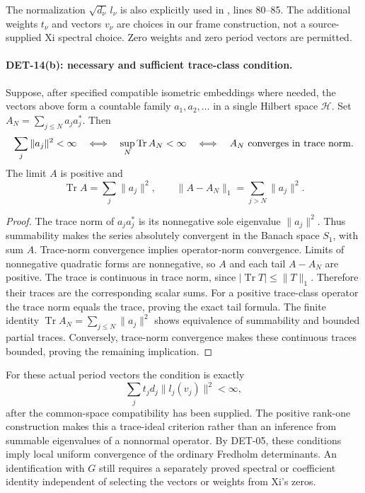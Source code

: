 \documentclass[11pt,a4paper]{article}
\newcommand{\Tr}{\operatorname{Tr}}
\newcommand{\fid}[1]{\textsf{#1}}
\begin{document}
The normalization \(\sqrt{d_\nu}\,l_\nu\) is also explicitly used in
,
lines 80--85. The additional weights \(t_\nu\) and vectors \(v_\nu\)
are choices in our frame construction, not a source-supplied Xi
spectral choice. Zero weights and zero period vectors are permitted.

\paragraph{DET-14(b): necessary and sufficient trace-class condition.}
Suppose, after specified compatible isometric embeddings where needed,
the vectors above form a countable family \(a_1,a_2,\ldots\) in a
single Hilbert space \(\mathcal H\). Set
\(A_N=\sum_{j\le N}a_ja_j^*\). Then
\[
 \sum_j\|a_j\|^2<\infty
 \quad\Longleftrightarrow\quad
 \sup_N\Tr A_N<\infty
 \quad\Longleftrightarrow\quad
 A_N\ \hbox{converges in trace norm}.
\]
The limit \(A\) is positive and
\[
 \Tr A=\sum_j\|a_j\|^2,\qquad
 \|A-A_N\|_1=\sum_{j>N}\|a_j\|^2.
\]
\begin{proof}
The trace norm of \(a_ja_j^*\) is its nonnegative sole eigenvalue
\(\|a_j\|^2\). Thus summability makes the series absolutely
convergent in the Banach space \(S_1\), with sum \(A\).
Trace-norm convergence implies operator-norm convergence.
Limits of nonnegative quadratic forms are nonnegative, so \(A\)
and each tail \(A-A_N\) are positive.
The trace is continuous in trace norm, since
\(|\Tr T|\le\|T\|_1\). Therefore their traces are the corresponding
scalar sums. For a positive trace-class operator the trace norm
equals the trace, proving the exact tail formula.
The finite identity \(\Tr A_N=\sum_{j\le N}\|a_j\|^2\)
shows equivalence of summability and bounded partial traces.
Conversely, trace-norm convergence makes these continuous traces
bounded, proving the remaining implication.
\end{proof}
For these actual period vectors the condition is exactly
\[
 \sum_j t_jd_j\|l_j(v_j)\|^2<\infty,
\]
after the common-space compatibility has been supplied.
The positive rank-one construction makes this a trace-ideal
criterion rather than an inference from summable eigenvalues of a
nonnormal operator. By \fid{DET-05}, these conditions imply local
uniform convergence of the ordinary Fredholm determinants.
An identification with \(G\) still requires a separately proved
spectral or coefficient identity independent of selecting the
vectors or weights from Xi's zeros.
\end{document}
